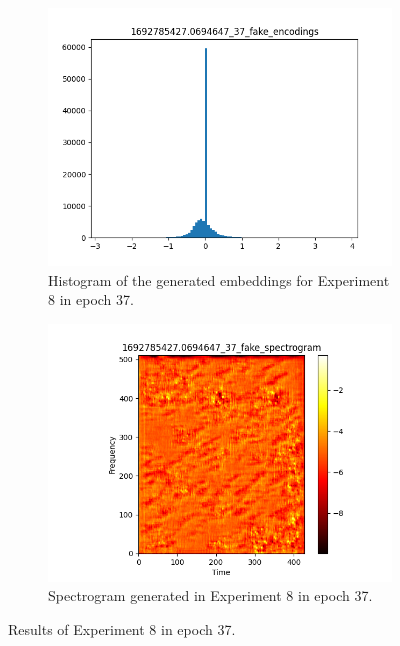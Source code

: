 \begin{figure}[!ht]
    \centering
    \begin{subfigure}{0.4\textwidth}
        \includegraphics[width=\textwidth]{figures/4.5-results/exp8_37_hist.png}
        \caption{Histogram of the generated embeddings for Experiment 8 in epoch 37.}
        \label{fig:exp8_37_hist}
    \end{subfigure}
    \begin{subfigure}{0.4\textwidth}
        \includegraphics[width=\textwidth]{figures/4.5-results/exp8_37_spectrogram.png}
        \caption{Spectrogram generated in Experiment 8 in epoch 37.}
        \label{fig:exp8_37_spectrogram}
    \end{subfigure}
    \caption{Results of Experiment 8 in epoch 37.}
    \label{fig:exp8_37_results}
\end{figure}

